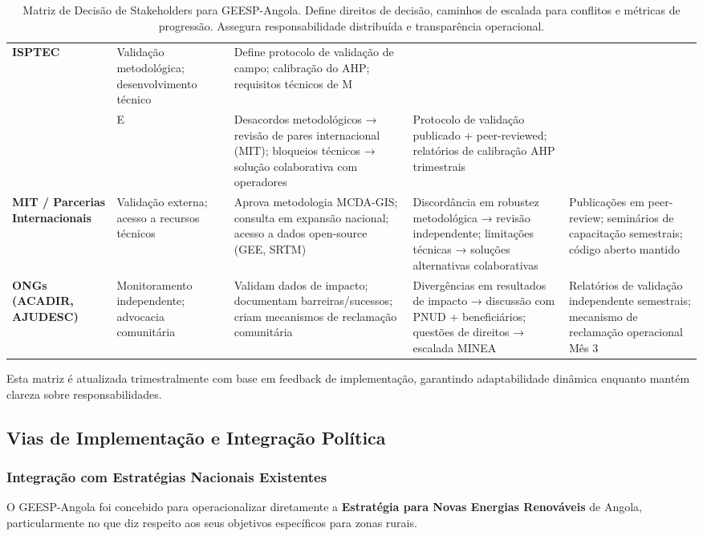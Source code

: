 \documentclass[12pt, a4paper]{article}
\begin{document}
\begin{table}[h!]
\begin{tabularx}{\textwidth}{|l|l|l|l|l|}
\hline
\textbf{ISPTEC} & Validação metodológica; desenvolvimento técnico & Define protocolo de validação de campo; calibração do AHP; requisitos técnicos de M\\&E & Desacordos metodológicos → revisão de pares internacional (MIT); bloqueios técnicos → solução colaborativa com operadores & Protocolo de validação publicado + peer-reviewed; relatórios de calibração AHP trimestrais \\
\hline
\textbf{MIT / Parcerias Internacionais} & Validação externa; acesso a recursos técnicos & Aprova metodologia MCDA-GIS; consulta em expansão nacional; acesso a dados open-source (GEE, SRTM) & Discordância em robustez metodológica → revisão independente; limitações técnicas → soluções alternativas colaborativas & Publicações em peer-review; seminários de capacitação semestrais; código aberto mantido \\
\hline
\textbf{ONGs (ACADIR, AJUDESC)} & Monitoramento independente; advocacia comunitária & Validam dados de impacto; documentam barreiras/sucessos; criam mecanismos de reclamação comunitária & Divergências em resultados de impacto → discussão com PNUD + beneficiários; questões de direitos → escalada MINEA & Relatórios de validação independente semestrais; mecanismo de reclamação operacional Mês 3 \\
\hline
\end{tabularx}
\caption{Matriz de Decisão de Stakeholders para GEESP-Angola. Define direitos de decisão, caminhos de escalada para conflitos e métricas de progressão. Assegura responsabilidade distribuída e transparência operacional.}
\label{tab:stakeholder_decisions}
\end{table}

Esta matriz é atualizada trimestralmente com base em feedback de implementação, garantindo adaptabilidade dinâmica enquanto mantém clareza sobre responsabilidades.

\subsection{Vias de Implementação e Integração Política}

\subsubsection{Integração com Estratégias Nacionais Existentes}

O GEESP-Angola foi concebido para operacionalizar diretamente a \textbf{Estratégia para Novas Energias Renováveis} de Angola, particularmente no que diz respeito aos seus objetivos específicos para zonas rurais.
\end{document}
